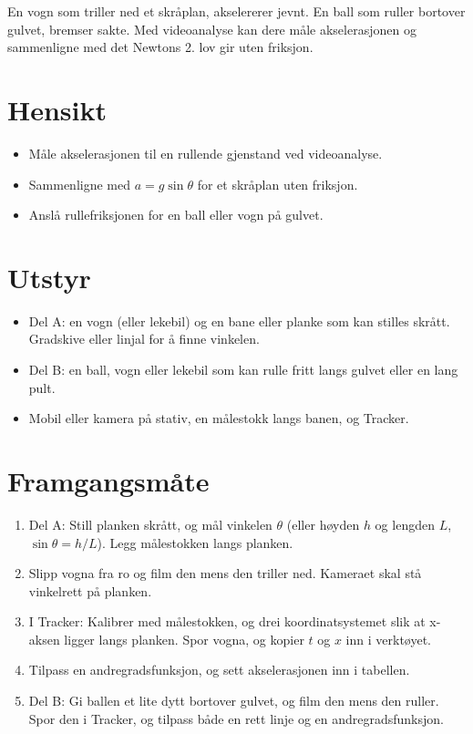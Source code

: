 \documentclass[11pt]{article}
\begin{document}

En vogn som triller ned et skråplan, akselererer jevnt. En ball som ruller bortover gulvet, bremser sakte. Med videoanalyse kan dere måle akselerasjonen og sammenligne med det Newtons 2. lov gir uten friksjon.

\section*{Hensikt}

\begin{itemize}
\item Måle akselerasjonen til en rullende gjenstand ved videoanalyse.
\item Sammenligne med $a = g \sin  θ$ for et skråplan uten friksjon.
\item Anslå rullefriksjonen for en ball eller vogn på gulvet.
\end{itemize}

\section*{Utstyr}

\begin{itemize}
\item Del A: en vogn (eller lekebil) og en bane eller planke som kan stilles skrått. Gradskive eller linjal for å finne vinkelen.
\item Del B: en ball, vogn eller lekebil som kan rulle fritt langs gulvet eller en lang pult.
\item Mobil eller kamera på stativ, en målestokk langs banen, og Tracker.
\end{itemize}

\section*{Framgangsmåte}

\begin{enumerate}
\item Del A: Still planken skrått, og mål vinkelen $θ$ (eller høyden $h$ og lengden $L$, $\sin  θ = h/L$). Legg målestokken langs planken.
\item Slipp vogna fra ro og film den mens den triller ned. Kameraet skal stå vinkelrett på planken.
\item I Tracker: Kalibrer med målestokken, og drei koordinatsystemet slik at x-aksen ligger langs planken. Spor vogna, og kopier $t$ og $x$ inn i verktøyet.
\item Tilpass en andregradsfunksjon, og sett akselerasjonen inn i tabellen.
\item Del B: Gi ballen et lite dytt bortover gulvet, og film den mens den ruller. Spor den i Tracker, og tilpass både en rett linje og en andregradsfunksjon.
\end{enumerate}
\end{document}
